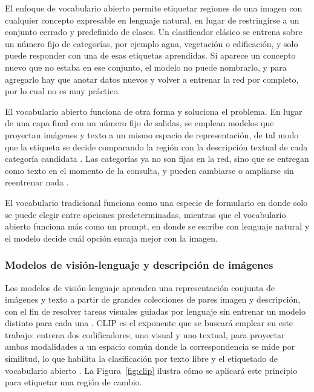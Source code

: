 El enfoque de vocabulario abierto permite etiquetar regiones de una imagen con cualquier concepto expresable en lenguaje natural, en lugar de restringirse a un conjunto cerrado y predefinido de clases. Un clasificador clásico se entrena sobre un número fijo de categorías, por ejemplo agua, vegetación o edificación, y solo puede responder con una de esas etiquetas aprendidas. Si aparece un concepto nuevo que no estaba en ese conjunto, el modelo no puede nombrarlo, y para agregarlo hay que anotar datos nuevos y volver a entrenar la red por completo, por lo cual no es muy práctico.

El vocabulario abierto funciona de otra forma y soluciona el problema. En lugar de una capa final con un número fijo de salidas, se emplean modelos que proyectan imágenes y texto a un mismo espacio de representación, de tal modo que la etiqueta se decide comparando la región con la descripción textual de cada categoría candidata \parencite{radford2021clip}. Las categorías ya no son fijas en la red, sino que se entregan como texto en el momento de la consulta, y pueden cambiarse o ampliarse sin reentrenar nada \parencite{kombol2025trainingfree}.

El vocabulario tradicional funciona como una especie de formulario en donde solo se puede elegir entre opciones predeterminadas, mientras que el vocabulario abierto funciona más como un prompt, en donde se escribe con lenguaje natural y el modelo decide cuál opción encaja mejor con la imagen.

\subsubsection{Modelos de visión-lenguaje y descripción de imágenes}

Los modelos de visión-lenguaje aprenden una representación conjunta de imágenes y texto a partir de grandes colecciones de pares imagen y descripción, con el fin de resolver tareas visuales guiadas por lenguaje sin entrenar un modelo distinto para cada una \parencite{zhang2024vlm}. CLIP es el exponente que se buscará emplear en este trabajo: entrena dos codificadores, uno visual y uno textual, para proyectar ambas modalidades a un espacio común donde la correspondencia se mide por similitud, lo que habilita la clasificación por texto libre y el etiquetado de vocabulario abierto \parencite{radford2021clip}. La Figura~\ref{fig:clip} ilustra cómo se aplicará este principio para etiquetar una región de cambio.

